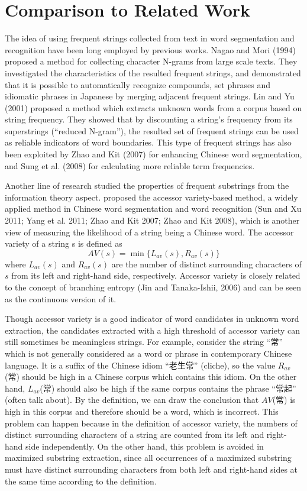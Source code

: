\documentclass[english]{jnlp_1.4}
\begin{document}
\section{Comparison to Related Work}

The idea of using frequent strings collected from text in word segmentation and recognition have been long employed by previous works.
Nagao and Mori (1994) proposed a method for collecting character N-grams from large scale texts. They investigated the characteristics of the resulted frequent strings, and demonstrated that it is possible to automatically recognize compounds, set phrases and idiomatic phrases in Japanese by merging adjacent frequent strings. Lin and Yu (2001) proposed a method which extracts unknown words from a corpus based on string frequency. They showed that by discounting a string's frequency from its superstrings (``reduced N-gram''), the resulted set of frequent strings can be used as reliable indicators of word boundaries. This type of frequent strings has also been exploited by Zhao and Kit (2007) for enhancing Chinese word segmentation, and Sung et al. (2008) for calculating more reliable term frequencies.

Another line of research studied the properties of frequent substrings from the information theory aspect.  proposed the accessor variety-based method, a widely applied method in Chinese word segmentation and word recognition (Sun and Xu 2011; Yang et al. 2011; Zhao and Kit 2007; Zhao and Kit 2008), which is another view of measuring the likelihood of a string being a Chinese word. The accessor variety of a string s is defined as
\[
 AV(s)=\min\{L_{av}(s),R_{av}(s)\}
\]
where $L_{av}(s)$ and $R_{av}(s)$ are the number of distinct surrounding characters of $s$ from its left and right-hand side, respectively. Accessor variety is closely related to the concept of branching entropy (Jin and Tanaka-Ishii, 2006) and can be seen as the continuous version of it. 

Though accessor variety is a good indicator of word candidates in unknown word extraction, the candidates extracted with a high threshold of accessor variety can still sometimes be meaningless strings. For example, consider the string ``常'' which is not generally considered as a word or phrase in contemporary Chinese language. It is a suffix of the Chinese idiom ``老生常'' (cliche), so the value $R_{av}$(常) should be high in a Chinese corpus which contains this idiom. On the other hand, $L_{av}$(常) should also be high if the same corpus contains the phrase ``常起'' (often talk about). By the definition, we can draw the conclusion that $AV$(常) is high in this corpus and therefore should be a word, which is incorrect. This problem can happen because in the definition of accessor variety, the numbers of distinct surrounding characters of a string are counted from its left and right-hand side independently. On the other hand, this problem is avoided in maximized substring extraction, since all occurrences of a maximized substring must have distinct surrounding characters from both left and right-hand sides at the same time according to the definition.
\end{document}
